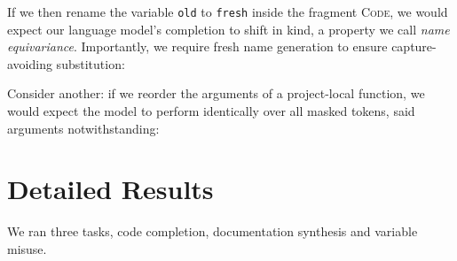 \documentclass[usenames,dvipsnames]{article} %
\begin{document}
  If we then rename the variable \texttt{old} to \texttt{fresh} inside the fragment \textsc{Code}, we would expect our language model's completion to shift in kind, a property we call \textit{name equivariance}. Importantly, we require fresh name generation to ensure capture-avoiding substitution:

  \begin{center}
    \begin{prooftree}
    \end{prooftree}
  \end{center}

  Consider another: if we reorder the arguments of a project-local function, we would expect the model to perform identically over all masked tokens, said arguments notwithstanding:

  \begin{center}
    \begin{prooftree}
    \end{prooftree}
  \end{center}

  \pagebreak\section{Detailed Results}\label{sec:detailed_results}

  We ran three tasks, code completion, documentation synthesis and variable misuse.
\end{document}
